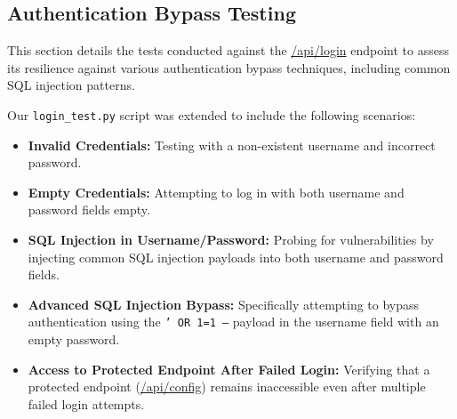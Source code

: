 \documentclass{article}
\begin{document}
\subsection{Authentication Bypass Testing}
This section details the tests conducted against the \url{/api/login} endpoint to assess its resilience against various authentication bypass techniques, including common SQL injection patterns.

Our \texttt{login\_test.py} script was extended to include the following scenarios:
\begin{itemize}
    \item \textbf{Invalid Credentials:} Testing with a non-existent username and incorrect password.
    \item \textbf{Empty Credentials:} Attempting to log in with both username and password fields empty.
    \item \textbf{SQL Injection in Username/Password:} Probing for vulnerabilities by injecting common SQL injection payloads into both username and password fields.
    \item \textbf{Advanced SQL Injection Bypass:} Specifically attempting to bypass authentication using the \texttt{' OR 1=1 --} payload in the username field with an empty password.
    \item \textbf{Access to Protected Endpoint After Failed Login:} Verifying that a protected endpoint (\url{/api/config}) remains inaccessible even after multiple failed login attempts.
\end{itemize}
\end{document}
